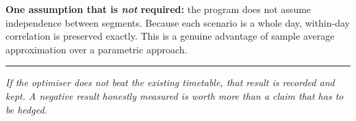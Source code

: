 \documentclass[11pt,a4paper]{article}
\begin{document}
\textbf{One assumption that is \emph{not} required:} the program does not assume independence
between segments. Because each scenario is a whole day, within-day correlation is preserved
exactly. This is a genuine advantage of sample average approximation over a parametric
approach.

\vspace{1em}
\hrule
\vspace{0.6em}
\noindent\small\textit{If the optimiser does not beat the existing timetable, that result is
recorded and kept. A negative result honestly measured is worth more than a claim that has to
be hedged.}
\end{document}
